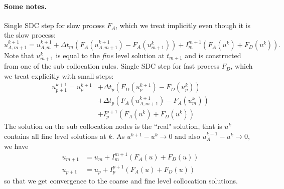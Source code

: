 \documentclass{article}
\begin{document}
\paragraph{Some notes.}
Single SDC step for slow process $F_A$, which we treat implicitly even though it is the slow process:
\begin{equation*}
	u_{A,m+1}^{k+1} = u_{A,m}^{k+1} + \Delta t_m \left( F_{A}(u^{k+1}_{A,m+1}) -F_{A}(u^{k}_{m+1}) \right) + I_m^{m+1}\left( F_{A}(u^k) + F_{D}(u^k) \right).
\end{equation*}
Note that $u^k_{m+1}$ is equal to the \emph{fine} level solution at $t_{m+1}$ and is constructed from one of the sub collocation rules.
Single SDC step for fast process $F_D$, which we treat explicitly with small steps:
\begin{align*}
	u_{p+1}^{k+1} = u_{p}^{k+1} &+ \Delta t_p \left( F_{D}(u^{k+1}_{p}) - F_{D}(u^k_p) \right) \\
							   &+ \Delta t_p \left( F_{A}(u^{k+1}_{A,m+1}) - F_{A}(u^k_m) \right) \\
							   &+ I_p^{p+1}\left( F_A(u^k) + F_D(u^k) \right)
\end{align*}
The solution on the sub collocation nodes is the ``real" solution, that is $u^k$ contains all fine level solutions at $k$.
As $u^{k+1} - u^k \to 0$ and also $u^{k+1}_A - u^k \to 0$, we have
\begin{align*}
	u_{m+1} &= u_{m} + I_m^{m+1} \left( F_A(u) + F_D(u) \right) \\
	u_{p+1} &= u_{p} + I_{p}^{p+1} \left( F_A(u) + F_D(u) \right)
\end{align*}
so that we get convergence to the coarse and fine level collocation solutions.
\end{document}
